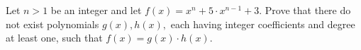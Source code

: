 Let $n > 1$ be an integer and let $f(x) = x^n + 5 \cdot x^{n-1} + 3.$ Prove that there do not exist polynomials $g(x),h(x),$ each having integer coefficients and degree at least one, such that $f(x) = g(x) \cdot h(x).$